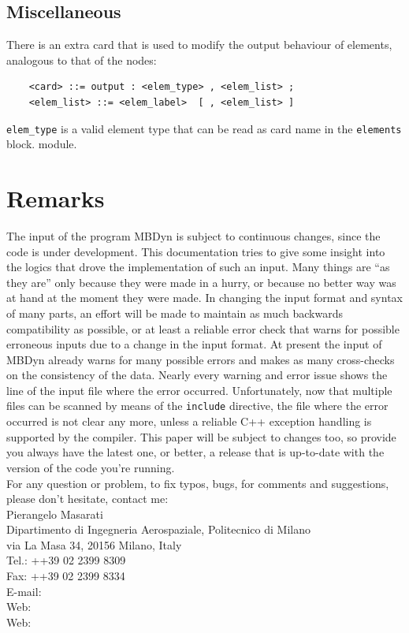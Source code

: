 \section{Miscellaneous}
There is an extra card that is used to modify the output behaviour of 
elements, analogous to that of the nodes:
\begin{verbatim}
    <card> ::= output : <elem_type> , <elem_list> ;
    <elem_list> ::= <elem_label>  [ , <elem_list> ]
\end{verbatim}
\texttt{elem\_type} is a valid element type that can be read 
as card name in the \texttt{elements} block.
module.





\chapter{Remarks}
The input of the program MBDyn is subject to continuous changes, since the
code is under development.
This documentation tries to give some insight into the logics that drove
the implementation of such an input.
Many things are ``as they are'' only because they were made in a hurry, 
or because no better way was at hand at the moment they were made.
In changing the input format and syntax of many parts, an effort 
will be made to maintain as much backwards compatibility as possible,
or at least a reliable error check that warns for possible erroneous 
inputs due to a change in the input format. 
At present the input of MBDyn already warns for many possible errors 
and makes as many cross-checks on the consistency of the data. 
Nearly every warning and error issue shows the line of the input file 
where the error occurred. 
Unfortunately, now that multiple files can be scanned by means of the 
\texttt{include} directive, the file where the error occurred is not clear 
any more, unless a reliable C++ exception handling is supported by the
compiler.
This paper will be subject to changes too, so provide you always have the
latest one, or better, a release that is up-to-date with the version of the
code you're running. \\
For any question or problem, to fix typos, bugs, for comments and
suggestions, please don't hesitate, contact me:\vspace{10mm}\\

\noindent
Pierangelo Masarati \\
Dipartimento di Ingegneria Aerospaziale, Politecnico di Milano \\
via La Masa 34, 20156 Milano, Italy \\
Tel.: ++39 02 2399 8309 \\
Fax: ++39 02 2399 8334 \\
E-mail:  \\
Web:  \\
Web: 

